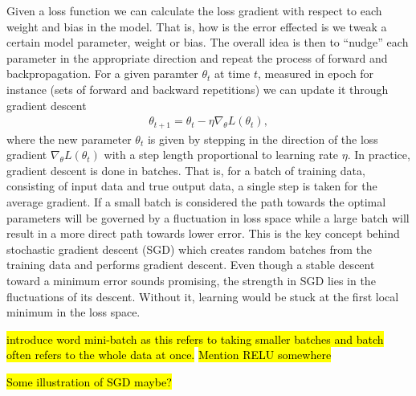 Given a loss function we can calculate the loss gradient with respect to each weight and bias in the model. That is, how is the error effected is we tweak a certain model parameter, weight or bias. The overall idea is then to  ``nudge'' each parameter in the appropriate direction and repeat the process of forward and backpropagation. For a given paramter $\theta_t$ at time $t$, measured in epoch for instance (sets of forward and backward repetitions) we can update it through gradient descent 
\begin{align*}
  \theta_{t+1} = \theta_t - \eta \nabla_\theta L(\theta_t),
\end{align*}
where the new parameter $\theta_t$ is given by stepping in the direction of the loss gradient $\nabla_\theta L(\theta_t)$ with a step length proportional to learning rate $\eta$. In practice, gradient descent is done in batches. That is, for a batch of training data, consisting of input data and true output data, a single step is taken for the average gradient. If a small batch is considered the path towards the optimal parameters will be governed by a fluctuation in loss space while a large batch will result in a more direct path towards lower error. This is the key concept behind stochastic gradient descent (SGD) which creates random batches from the training data and performs gradient descent. Even though a stable descent toward a minimum error sounds promising, the strength in \acrshort{SGD} lies in the fluctuations of its descent. Without it, learning would be stuck at the first local minimum in the loss space. 

\hl{introduce word mini-batch as this refers to taking smaller batches and batch often refers to the whole data at once.}
\hl{Mention RELU somewhere}


\hl{Some illustration of SGD maybe?}







